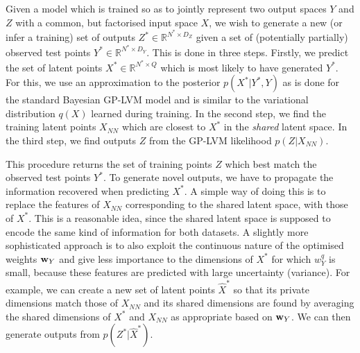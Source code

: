 Given a model which is trained so as to jointly represent two output spaces $Y$ and $Z$ with
a common, but factorised input space $X$, we wish to generate a new (or infer a training) set of outputs
$Z^* \in \mathbb{R}^{N^* \times D_Z}$ given a set of (potentially partially) observed test points $Y^* \in \mathbb{R}^{N^* \times D_Y}$.
This is done in three steps. Firstly, we predict the set of latent points $X^* \in \mathbb{R}^{N^* \times Q}$
which is most likely to have generated $Y^*$. For this, we use an approximation to the posterior $p(X^*|Y^*,Y)$
as is done for the standard Bayesian GP-LVM model \cite{Titsias:bayesGPLVM10,Damianou:vgpds11} and is
similar to the variational distribution $q(X)$ learned during training.
In the second step, we find the training latent points $X_{NN}$ which are closest to $X^*$ in the \emph{shared}
latent space. 
In the third step, we find outputs $Z$ from the GP-LVM likelihood $p(Z | X_{NN})$.

\par This procedure returns the set of training points $Z$ which best match the observed test points $Y^*$.
To generate novel outputs, we have to propagate the information recovered when predicting $X^*$. 
A simple way of doing this is to replace the features of $X_{NN}$ corresponding to the shared latent space,
 with those of $X^*$. This is a reasonable idea, since the shared latent space is supposed to encode the same
 kind of information for both datasets.
 A slightly more sophisticated approach is to also exploit the continuous nature of the
 optimised weights $\mathbf{w}_Y$ and give less importance to the dimensions of $X^*$ for which $w_Y^q$ is small,
 because these features are predicted with large uncertainty (variance).
 For example, we can create a new set of latent points $\hat{X}^{*}$ so that its private dimensions match those
 of $X_{NN}$ and its shared dimensions are found by averaging  
the shared dimensions of $X^*$ and $X_{NN}$ 
 as appropriate based on $\mathbf{w}_Y$. We can then generate outputs from $p(Z^* | \hat{X}^{*})$.

